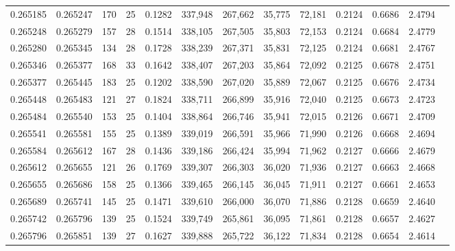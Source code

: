 \begin{tabular}{rrrrrrrrrrrrr}
0.265185 & 0.265247 &   170 &  25 &                                     0.1282 & 337,948 & 267,662 &  35,775 &  72,181 & 0.2124 & 0.6686 & 2.4794 \\
0.265248 & 0.265279 &   157 &  28 &                                     0.1514 & 338,105 & 267,505 &  35,803 &  72,153 & 0.2124 & 0.6684 & 2.4779 \\
0.265280 & 0.265345 &   134 &  28 &                                     0.1728 & 338,239 & 267,371 &  35,831 &  72,125 & 0.2124 & 0.6681 & 2.4767 \\
0.265346 & 0.265377 &   168 &  33 &                                     0.1642 & 338,407 & 267,203 &  35,864 &  72,092 & 0.2125 & 0.6678 & 2.4751 \\
0.265377 & 0.265445 &   183 &  25 &                                     0.1202 & 338,590 & 267,020 &  35,889 &  72,067 & 0.2125 & 0.6676 & 2.4734 \\
0.265448 & 0.265483 &   121 &  27 &                                     0.1824 & 338,711 & 266,899 &  35,916 &  72,040 & 0.2125 & 0.6673 & 2.4723 \\
0.265484 & 0.265540 &   153 &  25 &                                     0.1404 & 338,864 & 266,746 &  35,941 &  72,015 & 0.2126 & 0.6671 & 2.4709 \\
0.265541 & 0.265581 &   155 &  25 &                                     0.1389 & 339,019 & 266,591 &  35,966 &  71,990 & 0.2126 & 0.6668 & 2.4694 \\
0.265584 & 0.265612 &   167 &  28 &                                     0.1436 & 339,186 & 266,424 &  35,994 &  71,962 & 0.2127 & 0.6666 & 2.4679 \\
0.265612 & 0.265655 &   121 &  26 &                                     0.1769 & 339,307 & 266,303 &  36,020 &  71,936 & 0.2127 & 0.6663 & 2.4668 \\
0.265655 & 0.265686 &   158 &  25 &                                     0.1366 & 339,465 & 266,145 &  36,045 &  71,911 & 0.2127 & 0.6661 & 2.4653 \\
0.265689 & 0.265741 &   145 &  25 &                                     0.1471 & 339,610 & 266,000 &  36,070 &  71,886 & 0.2128 & 0.6659 & 2.4640 \\
0.265742 & 0.265796 &   139 &  25 &                                     0.1524 & 339,749 & 265,861 &  36,095 &  71,861 & 0.2128 & 0.6657 & 2.4627 \\
0.265796 & 0.265851 &   139 &  27 &                                     0.1627 & 339,888 & 265,722 &  36,122 &  71,834 & 0.2128 & 0.6654 & 2.4614 \\

\end{tabular}
